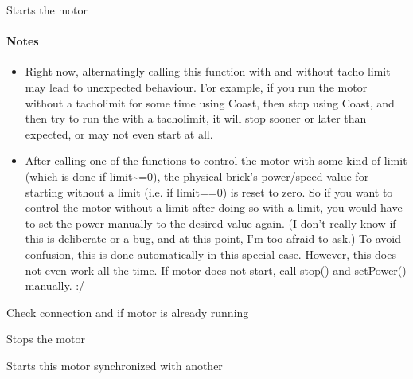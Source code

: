 \documentclass[letterpaper,10pt,english]{sphinxmanual}
\begin{document}
\begin{fulllineitems}
\begin{fulllineitems}
\end{fulllineitems}


\begin{fulllineitems}
\label{source:source.Motor.start}
Starts the motor
\paragraph{Notes}
\begin{itemize}
\item {} 
Right now, alternatingly calling this function with and without tacho limit
may lead to unexpected behaviour. For example, if you run the motor without
a tacholimit for some time using Coast, then stop using Coast, and then try
to run the with a tacholimit, it will stop sooner or later than expected,
or may not even start at all.

\item {} 
After calling one of the functions to control the motor with some kind of
limit (which is done if limit\textasciitilde{}=0), the physical brick's power/speed value for
starting without a limit (i.e. if limit==0) is reset to zero. So if you want
to control the motor without a limit after doing so with a limit, you would
have to set the power manually to the desired value again. (I don't really
know if this is deliberate or a bug, and at this point, I'm too afraid to ask.)
To avoid confusion, this is done automatically in this special case.
However, this does not even work all the time. If motor does not
start, call stop() and setPower() manually. :/

\end{itemize}

Check connection and if motor is already running

\end{fulllineitems}


\begin{fulllineitems}
\label{source:source.Motor.stop}
Stops the motor

\end{fulllineitems}


\begin{fulllineitems}
\label{source:source.Motor.syncedStart}
Starts this motor synchronized with another


\end{fulllineitems}
\end{fulllineitems}
\end{document}
